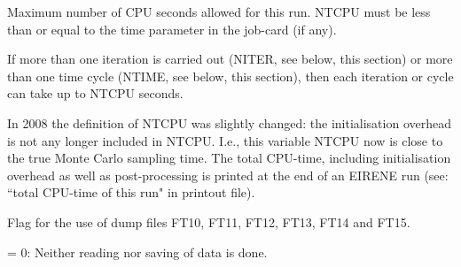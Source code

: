 \begin{description}
\begin{description}
        \end{description}
  \item[NTCPU] Maximum number of CPU seconds allowed for this run.
        NTCPU must be less than or equal to the time parameter in the job-card (if
        any).

        If more than one iteration is carried out (NITER, see below, this section) or
        more than one time cycle (NTIME, see below, this section), then each iteration
        or cycle can take up to NTCPU seconds.

        In 2008 the definition of NTCPU was slightly changed:
        the initialisation overhead is not any longer included in NTCPU.
        I.e., this variable NTCPU now is close to the true Monte Carlo sampling time.
        The total CPU-time, including initialisation overhead as well as
        post-processing is printed at the end of an EIRENE run (see: ``total CPU-time
        of this run" in printout file).
  \item[NFILE] Flag for the use of dump files FT10, FT11, FT12, FT13, FT14 and
        FT15.

        = 0: Neither reading nor saving of data is done.


\end{description}
